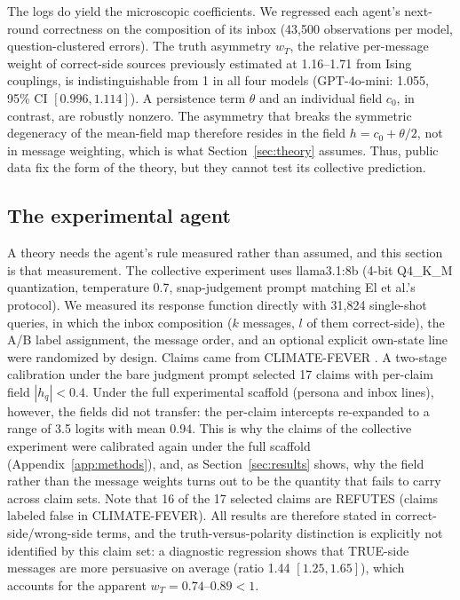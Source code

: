 \documentclass{ieeeaccess}
\begin{document}
The logs do yield the microscopic coefficients. We regressed each agent's
next-round correctness on the composition of its inbox (43{,}500
observations per model, question-clustered errors). The truth asymmetry
$w_T$, the relative per-message weight of correct-side sources previously
estimated at 1.16--1.71 from Ising couplings, is indistinguishable from 1
in all four models (GPT-4o-mini: 1.055, 95\% CI $[0.996, 1.114]$). A
persistence term $\theta$ and an individual field $c_0$, in contrast, are
robustly nonzero. The asymmetry that breaks the symmetric degeneracy of the
mean-field map therefore resides in the field $h = c_0 + \theta/2$, not in
message weighting, which is what Section~\ref{sec:theory} assumes. Thus,
public data fix the form of the theory, but they cannot test its
collective prediction.

\subsection{The experimental agent}

A theory needs the agent's rule measured rather than assumed, and this
section is that measurement. The collective experiment uses llama3.1:8b
(4-bit Q4\_K\_M quantization, temperature 0.7, snap-judgement prompt
matching El et al.'s protocol). We measured its response function directly
with 31{,}824 single-shot queries, in which the inbox composition ($k$
messages, $l$ of them correct-side), the A/B label assignment, the message
order, and an optional explicit own-state line were randomized by design.
Claims came from CLIMATE-FEVER \cite{Diggelmann2020}. A two-stage
calibration under the bare judgment prompt selected 17 claims with
per-claim field $|h_q| < 0.4$. Under the full experimental scaffold
(persona and inbox lines), however, the fields did not transfer: the
per-claim intercepts re-expanded to a range of 3.5 logits with mean 0.94.
This is why the claims of the collective experiment were calibrated again
under the full scaffold (Appendix~\ref{app:methods}), and, as Section~\ref{sec:results} shows,
why the field rather than the message weights turns out to be the quantity
that fails to carry across claim sets. Note that 16 of the 17 selected
claims are REFUTES (claims labeled false in CLIMATE-FEVER). All results are
therefore stated in correct-side/wrong-side terms, and the
truth-versus-polarity distinction is explicitly not identified by this
claim set: a diagnostic regression shows that TRUE-side messages are more
persuasive on average (ratio 1.44 $[1.25, 1.65]$), which accounts for the
apparent $w_T = 0.74$--$0.89 < 1$.
\end{document}
